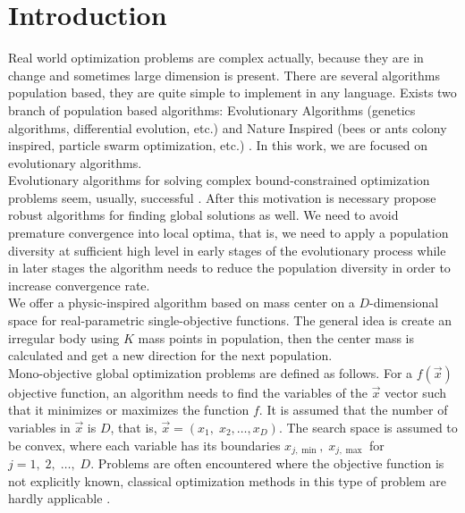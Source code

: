 \documentclass[graybox]{svmult}
\begin{document}
\section{Introduction}
Real world optimization problems  are complex actually, because they are in change and sometimes large dimension is present. There are several algorithms population based, they are quite simple to implement in any language. Exists two branch of population based algorithms: Evolutionary Algorithms (genetics algorithms, differential evolution, etc.) \cite{jso2017, melanie96, ed1995} and Nature Inspired (bees or ants colony inspired, particle swarm optimization, etc.) \cite{abc2005,pso1995}. In this work, we are focused on evolutionary algorithms.\\

Evolutionary algorithms for solving complex bound-constrained optimization problems seem, usually, successful \cite{ed1995}. After this motivation is necessary propose robust algorithms for finding global solutions as well. We need to avoid premature convergence into local optima, that is, we need to apply a population diversity at sufficient high level in early stages of the evolutionary process while in later stages the algorithm needs to reduce the population diversity in order to increase convergence rate.\\

We offer a  physic-inspired algorithm based on mass center on a $D$-dimensional space for  real-parametric single-objective functions. The general idea is create an irregular body using $K$ mass points in population, then the center mass is calculated and get a new direction for the next population.\\

Mono-objective global optimization problems are defined as follows. For a $f(\vec{x})$ objective function, an
algorithm needs to find the variables of the $\vec{x}$ vector such that it minimizes or maximizes the function
$f$. It is assumed that the number of variables in $\vec{x}$ is $D$, that is, $\vec{x} = (x_1,\; x_2 , \ldots , x_D )$. The search space is assumed to be
convex, where each variable has its  boundaries $x_{j, \min}, \;  x_{j, \max} $ for $j = 1,\; 2,\; \ldots,\; D$. Problems are often encountered where the objective function is not explicitly known, classical optimization methods in this type of problem are hardly applicable \cite{problemas}.\\
\end{document}
